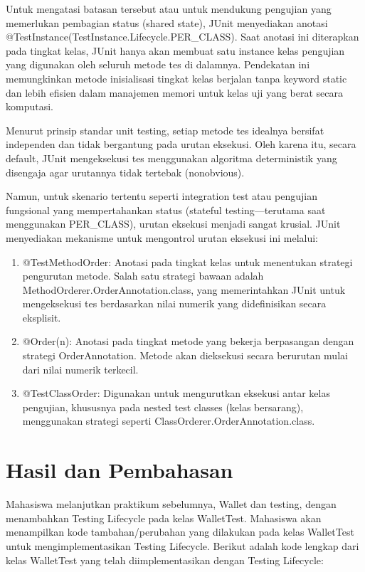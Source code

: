 \documentclass[a4paper,12pt]{article}
\begin{document}
Untuk mengatasi batasan tersebut atau untuk mendukung pengujian yang memerlukan pembagian status (shared state), JUnit menyediakan anotasi @TestInstance(TestInstance.Lifecycle.PER\_CLASS). Saat anotasi ini diterapkan pada tingkat kelas, JUnit hanya akan membuat satu instance kelas pengujian yang digunakan oleh seluruh metode tes di dalamnya. Pendekatan ini memungkinkan metode inisialisasi tingkat kelas berjalan tanpa keyword static dan lebih efisien dalam manajemen memori untuk kelas uji yang berat secara komputasi.

Menurut prinsip standar unit testing, setiap metode tes idealnya bersifat independen dan tidak bergantung pada urutan eksekusi. Oleh karena itu, secara default, JUnit mengeksekusi tes menggunakan algoritma deterministik yang disengaja agar urutannya tidak tertebak (nonobvious).

Namun, untuk skenario tertentu seperti integration test atau pengujian fungsional yang mempertahankan status (stateful testing—terutama saat menggunakan PER\_CLASS), urutan eksekusi menjadi sangat krusial. JUnit menyediakan mekanisme untuk mengontrol urutan eksekusi ini melalui:
\begin{enumerate}
    \item @TestMethodOrder: Anotasi pada tingkat kelas untuk menentukan strategi pengurutan metode. Salah satu strategi bawaan adalah MethodOrderer.OrderAnnotation.class, yang memerintahkan JUnit untuk mengeksekusi tes berdasarkan nilai numerik yang didefinisikan secara eksplisit.

    \item @Order(n): Anotasi pada tingkat metode yang bekerja berpasangan dengan strategi OrderAnnotation. Metode akan dieksekusi secara berurutan mulai dari nilai numerik terkecil.

    \item @TestClassOrder: Digunakan untuk mengurutkan eksekusi antar kelas pengujian, khususnya pada nested test classes (kelas bersarang), menggunakan strategi seperti ClassOrderer.OrderAnnotation.class.
\end{enumerate}

\section{Hasil dan Pembahasan}
Mahasiswa melanjutkan praktikum sebelumnya, Wallet dan testing, dengan menambahkan Testing Lifecycle pada kelas WalletTest. Mahasiswa akan menampilkan kode tambahan/perubahan yang dilakukan pada kelas WalletTest untuk mengimplementasikan Testing Lifecycle. Berikut adalah kode lengkap dari kelas WalletTest yang telah diimplementasikan dengan Testing Lifecycle:
\end{document}
